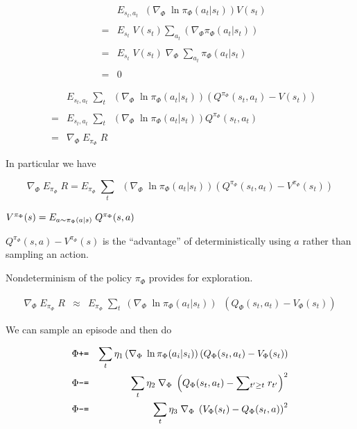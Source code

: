 {

\begin{eqnarray*}
 & & E_{s_t,a_t} \;  \; \left(\nabla_\Phi \;\ln \pi_\Phi(a_t|s_t)\right) V(s_t) \\
 \\
 & = & E_{s_t} \;  V(s_t) \sum_{a_t} \left(\nabla_\Phi \pi_\Phi(a_t|s_t)\right) \\
 \\
 & = & E_{s_t} \;  V(s_t)\; \nabla_\Phi\; \sum_{a_t} \pi_\Phi(a_t|s_t) \\
 \\
 & = & 0
\end{eqnarray*}



\begin{eqnarray*}
 & & E_{s_t,a_t}\; \sum_t\; \; \left(\nabla_\Phi \;\ln \pi_\Phi(a_t|s_t)\right)(Q^{\pi_\Phi}(s_t,a_t) - V(s_t)) \\
 \\
 & = & E_{s_t,a_t} \; \sum_t\; \; \left(\nabla_\Phi \;\ln \pi_\Phi(a_t|s_t)\right)Q^{\pi_\Phi}(s_t,a_t) \\
 \\
 & = & \nabla_\Phi \; E_{\pi_\Phi}\;R
\end{eqnarray*}



In particular we have

$$\nabla_\Phi \;E_{\pi_\Phi}\; R = E_{\pi_\Phi}\; \sum_t\; \; \left(\nabla_\Phi \;\ln \pi_\Phi(a_t|s_t)\right)(Q^{\pi_\Phi}(s_t,a_t) - V^{\pi_\Phi}(s_t))$$

\vfill
$V^{\pi_\Phi}(s) = E_{a \sim \pi_\Phi(a|s)}\;Q^{\pi_\Phi}(s,a)$

\vfill
$Q^{\pi_\Phi}(s,a) - V^{\pi_\Phi}(s)$ is the ``advantage'' of deterministically using $a$ rather than sampling an action.

\vfill
Nondeterminism of the policy $\pi_\Phi$ provides for exploration.


\begin{eqnarray*}
  \nabla_\Phi \;E_{\pi_\Phi}\;R   & \approx & E_{\pi_\Phi} \; \sum_t\; \left(\nabla_\Phi \;\ln \pi_\Phi(a_t|s_t)\right) \;\;(Q_\Phi(s_t,a_t) - V_\Phi(s_t))
\end{eqnarray*}

We can sample an episode and then do

\begin{eqnarray*}
  \Phi  &\mbox{\tt +=} & \sum_t \eta_1\left(\nabla_{\Phi}\;\ln \pi_{\Phi}(a_i|s_i)\right)(Q_\Phi(s_t,a_t) - V_\Phi(s_t))\\
  \Phi & \mbox{\tt -=} & \sum_t \eta_2 \;\nabla_{\Phi}\;\left(Q_\Phi(s_t,a_t) - \sum \!_{t' \geq t}\; r_{t'}\right)^2 \\
  \Phi & \mbox{\tt -=} & \sum_t \eta_3 \;\nabla_{\Phi}\;\left(V_\Phi(s_t) - Q_\Phi(s_t,a)\right)^2 \\
\end{eqnarray*}


}
